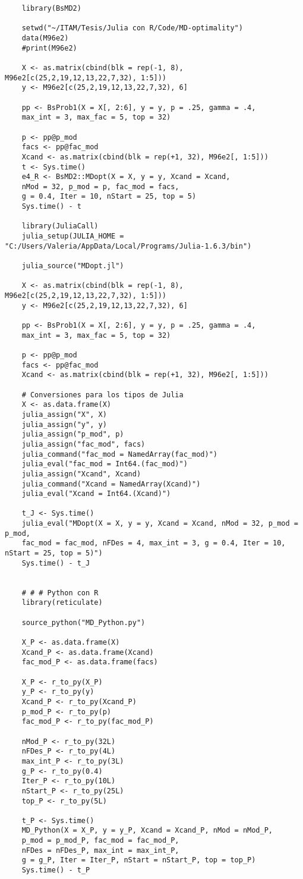 \begin{verbatim}
	library(BsMD2)
	
	setwd("~/ITAM/Tesis/Julia con R/Code/MD-optimality")
	data(M96e2)
	#print(M96e2)
	
	X <- as.matrix(cbind(blk = rep(-1, 8), M96e2[c(25,2,19,12,13,22,7,32), 1:5]))
	y <- M96e2[c(25,2,19,12,13,22,7,32), 6]
	
	pp <- BsProb1(X = X[, 2:6], y = y, p = .25, gamma = .4, 
	max_int = 3, max_fac = 5, top = 32)
	
	p <- pp@p_mod
	facs <- pp@fac_mod
	Xcand <- as.matrix(cbind(blk = rep(+1, 32), M96e2[, 1:5]))
	t <- Sys.time()
	e4_R <- BsMD2::MDopt(X = X, y = y, Xcand = Xcand, 
	nMod = 32, p_mod = p, fac_mod = facs, 
	g = 0.4, Iter = 10, nStart = 25, top = 5)
	Sys.time() - t
	
	library(JuliaCall)
	julia_setup(JULIA_HOME = "C:/Users/Valeria/AppData/Local/Programs/Julia-1.6.3/bin")
	
	julia_source("MDopt.jl")
	
	X <- as.matrix(cbind(blk = rep(-1, 8), M96e2[c(25,2,19,12,13,22,7,32), 1:5]))
	y <- M96e2[c(25,2,19,12,13,22,7,32), 6]
	
	pp <- BsProb1(X = X[, 2:6], y = y, p = .25, gamma = .4, 
	max_int = 3, max_fac = 5, top = 32)
	
	p <- pp@p_mod
	facs <- pp@fac_mod
	Xcand <- as.matrix(cbind(blk = rep(+1, 32), M96e2[, 1:5]))
	
	# Conversiones para los tipos de Julia
	X <- as.data.frame(X)
	julia_assign("X", X)
	julia_assign("y", y)
	julia_assign("p_mod", p)
	julia_assign("fac_mod", facs)
	julia_command("fac_mod = NamedArray(fac_mod)")
	julia_eval("fac_mod = Int64.(fac_mod)")
	julia_assign("Xcand", Xcand)
	julia_command("Xcand = NamedArray(Xcand)")
	julia_eval("Xcand = Int64.(Xcand)")
	
	t_J <- Sys.time()
	julia_eval("MDopt(X = X, y = y, Xcand = Xcand, nMod = 32, p_mod = p_mod, 
	fac_mod = fac_mod, nFDes = 4, max_int = 3, g = 0.4, Iter = 10, nStart = 25, top = 5)")
	Sys.time() - t_J
	
	
	# # # Python con R
	library(reticulate)
	
	source_python("MD_Python.py")
	
	X_P <- as.data.frame(X)
	Xcand_P <- as.data.frame(Xcand)
	fac_mod_P <- as.data.frame(facs)
	
	X_P <- r_to_py(X_P)
	y_P <- r_to_py(y) 
	Xcand_P <- r_to_py(Xcand_P)
	p_mod_P <- r_to_py(p)
	fac_mod_P <- r_to_py(fac_mod_P)
	
	nMod_P <- r_to_py(32L)
	nFDes_P <- r_to_py(4L)
	max_int_P <- r_to_py(3L)
	g_P <- r_to_py(0.4)
	Iter_P <- r_to_py(10L)
	nStart_P <- r_to_py(25L)
	top_P <- r_to_py(5L)
	
	t_P <- Sys.time()
	MD_Python(X = X_P, y = y_P, Xcand = Xcand_P, nMod = nMod_P, 
	p_mod = p_mod_P, fac_mod = fac_mod_P, 
	nFDes = nFDes_P, max_int = max_int_P, 
	g = g_P, Iter = Iter_P, nStart = nStart_P, top = top_P)
	Sys.time() - t_P
\end{verbatim} 

